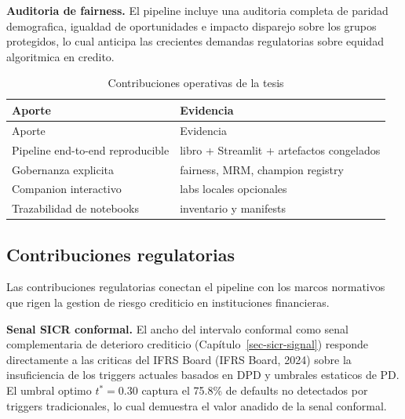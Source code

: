 \documentclass[
  spanish,
  11pt,
  letterpaper,
]{scrbook}
\theoremstyle{plain}
\theoremstyle{remark}
\begin{document}
\textbf{Auditoria de fairness.} El pipeline incluye una auditoria
completa de paridad demografica, igualdad de oportunidades e impacto
disparejo sobre los grupos protegidos, lo cual anticipa las crecientes
demandas regulatorias sobre equidad algoritmica en credito.

\begin{longtable}[]{@{}
  >{\raggedright\arraybackslash}p{}
  >{\raggedright\arraybackslash}p{}@{}}
\caption{Contribuciones operativas de la
tesis}\label{tbl-thesis-contrib}\tabularnewline
\toprule\noalign{}
\begin{minipage}[b]{\linewidth}\raggedright
Aporte
\end{minipage} & \begin{minipage}[b]{\linewidth}\raggedright
Evidencia
\end{minipage} \\
\midrule\noalign{}
\endfirsthead
\toprule\noalign{}
\begin{minipage}[b]{\linewidth}\raggedright
Aporte
\end{minipage} & \begin{minipage}[b]{\linewidth}\raggedright
Evidencia
\end{minipage} \\
\midrule\noalign{}
\endhead
\bottomrule\noalign{}
\endlastfoot
Pipeline end-to-end reproducible & libro + Streamlit + artefactos
congelados \\
Gobernanza explicita & fairness, MRM, champion registry \\
Companion interactivo & 5 labs locales opcionales \\
Trazabilidad de notebooks & inventario y manifests \\
\end{longtable}

\subsection{Contribuciones regulatorias}\label{sec-contrib-regulatory}

Las contribuciones regulatorias conectan el pipeline con los marcos
normativos que rigen la gestion de riesgo crediticio en instituciones
financieras.

\textbf{Senal SICR conformal.} El ancho del intervalo conformal como
senal complementaria de deterioro crediticio
(Capítulo~\ref{sec-sicr-signal}) responde directamente a las criticas
del IFRS Board (IFRS Board, 2024) sobre la insuficiencia de los triggers
actuales basados en DPD y umbrales estaticos de PD. El umbral optimo
\(t^* = 0.30\) captura el 75.8\% de defaults no detectados por triggers
tradicionales, lo cual demuestra el valor anadido de la senal conformal.
\end{document}
